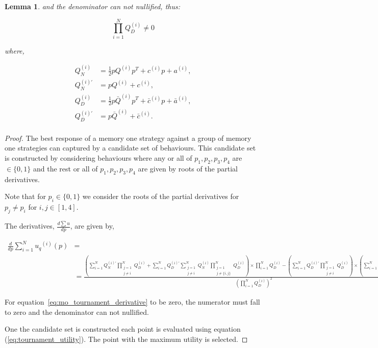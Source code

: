 \documentclass[10pt]{article}
\newtheorem{lemma}[theorem]{Lemma}
\begin{document}
\begin{lemma}
    and the denominator can not nullified, thus:

    \begin{equation}\label{eq:group_derivative_denominator_condition}
        \prod\limits_{i=1} ^ N Q_{D}^{(i)} \neq 0
    \end{equation}

    where,

    \begin{align*}
        Q_{N}^{(i) } & = \frac{1}{2} pQ^{(i)} p^T + c^{(i)} p + a^ {(i)}, \\
        Q_{N}^{(i)'} & =  pQ^{(i)} + c^{(i)}, \\
        Q_{D}^{(i) } & = \frac{1}{2} p\bar{Q}^{(i)} p^T + \bar{c}^{(i)} p + \bar{a}^ {(i)}, \\
        Q_{D}^{(i)'} & =  p\bar{Q}^{(i)} + \bar{c}^{(i)}. \\
    \end{align*}
\end{lemma}

\begin{proof} The best response of a memory one strategy against a group of memory
    one strategies can captured by a candidate set of behaviours. This candidate
    set is constructed by considering behaviours where any or all of \(p_1, p_2, p_3, p_4\)
    are \(\in \{0, 1\}\) and the rest or all of \(p_1, p_2, p_3, p_4\) are given by
    roots of the partial derivatives.

    Note that for \(p_i \in \{0, 1\}\) we consider the roots of the partial derivatives
    for \(p_j \neq p_i\) for \(i,j \in [1, 4]\).

    The derivatives, \(\frac{d\sum u}{dp}\), are given by,

    {\scriptsize
    \begin{align}\label{eq:mo_tournament_derivative}
        \frac{d}{dp} \sum\limits_{i=1} ^ {N} {u_q}^{(i)} (p) & = \nonumber \\
        & =\frac{
        (\sum\limits_{i=1} ^ {N} Q_{N}^{(i)'} \prod_{\substack{j=1 \\ j \neq i}} ^ N Q_{D}^{(i)}
        + \sum\limits_{i=1} ^ {N} Q_{D}^{(i)'} \sum_{\substack{j=1 \\ j \neq i}} ^ {N} Q_{N}^{(i)}
       \prod_{\substack{j=1 \\ j \neq \{i, j\}}} ^ N Q_{D}^{(i)}) \times
       \prod\limits_{i=1} ^ N Q_{D}^{(i)} - (\sum\limits_{i=1} ^ {N} Q_{D}^{(i)'}
       \prod_{\substack{j=1 \\ j \neq i}} ^ N Q_{D}^{(i)}) \times 
       (\sum\limits_{i=1} ^ {N} Q_{N}^{(i)} \prod_{\substack{j=1 \\ j \neq i}} ^ N Q_{D}^{(i)})}
        {(\prod\limits_{i=1} ^ N Q_{D}^{(i)})^{2}}
    \end{align}
    }

    For equation~\ref{eq:mo_tournament_derivative} to be zero, the numerator must fall
    to zero and the denominator can not nullified.

    One the candidate set is constructed each point is evaluated using equation
    (\ref{eq:tournament_utility}). The point with the maximum utility is selected.
\end{proof}
\end{document}
